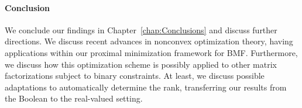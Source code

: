 \paragraph{Conclusion} We conclude our findings in Chapter~\ref{chap:Conclusions} and discuss further directions. We discuss recent advances in nonconvex optimization theory, having applications within our proximal minimization framework for BMF. Furthermore, we discuss how this optimization scheme is possibly applied to other matrix factorizations subject to binary constraints. At least, we discuss possible adaptations to automatically determine the rank, transferring our results from the Boolean to the real-valued setting. 